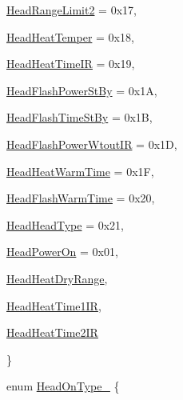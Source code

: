 \begin{DoxyCompactItemize}
\begin{DoxyCompactItemize}
\item\mbox{\hyperlink{classHeadSetting_a937c9f57091b4015548d4d6cac973a32a7be69001c09b87de316c340160cff80c}{Head\+Range\+Limit2}} = 0x17, 
\item\mbox{\hyperlink{classHeadSetting_a937c9f57091b4015548d4d6cac973a32ac0ccd3f62dd3b89815f6825ef6f7453c}{Head\+Heat\+Temper}} = 0x18, 
\item\mbox{\hyperlink{classHeadSetting_a937c9f57091b4015548d4d6cac973a32ac6f49cc16663fdfaefce810d20b98f6d}{Head\+Heat\+Time\+IR}} = 0x19, 
\item\mbox{\hyperlink{classHeadSetting_a937c9f57091b4015548d4d6cac973a32a851c50261e22a531f1e6ce834e3313af}{Head\+Flash\+Power\+St\+By}} = 0x1A, 
\item\mbox{\hyperlink{classHeadSetting_a937c9f57091b4015548d4d6cac973a32afe71ff94e7a672c7a3e2eaadaa7675a0}{Head\+Flash\+Time\+St\+By}} = 0x1B, 
\item\mbox{\hyperlink{classHeadSetting_a937c9f57091b4015548d4d6cac973a32aaf01e040d13fff0dabb8a193e9a7cf96}{Head\+Flash\+Power\+Wtout\+IR}} = 0x1D, 
\item\mbox{\hyperlink{classHeadSetting_a937c9f57091b4015548d4d6cac973a32aaca3ad6e41eb1cc2ceeab06cafb25da7}{Head\+Heat\+Warm\+Time}} = 0x1F, 
\item\mbox{\hyperlink{classHeadSetting_a937c9f57091b4015548d4d6cac973a32aa13d50d23c783e119c88b7fea0ee0ac8}{Head\+Flash\+Warm\+Time}} = 0x20, 
\item\mbox{\hyperlink{classHeadSetting_a937c9f57091b4015548d4d6cac973a32ac44c8ccfa822c07701e233877a911b24}{Head\+Head\+Type}} = 0x21, 
\item\mbox{\hyperlink{classHeadSetting_a937c9f57091b4015548d4d6cac973a32a6531411ce72b5da2041ac9247af86038}{Head\+Power\+On}} = 0x01, 
\item\mbox{\hyperlink{classHeadSetting_a937c9f57091b4015548d4d6cac973a32ac91c9da06ef3db0e017f428ea513dd72}{Head\+Heat\+Dry\+Range}}, 
\item\mbox{\hyperlink{classHeadSetting_a937c9f57091b4015548d4d6cac973a32a29d2a6e6e8cb5c1b60eb10cae88f90a5}{Head\+Heat\+Time1\+IR}}, 
\item\mbox{\hyperlink{classHeadSetting_a937c9f57091b4015548d4d6cac973a32a6e5c2056246cce850f12e45f0ef63c93}{Head\+Heat\+Time2\+IR}}
\end{DoxyCompactItemize}
 \}
\item 
enum
 \mbox{\hyperlink{classHeadSetting_a4b20eca534a73ccbb980a216ea17c2a0}{Head\+On\+Type\+\_\+}} \{ 
 \begin{DoxyCompactItemize}

\end{DoxyCompactItemize}
\end{DoxyCompactItemize}
